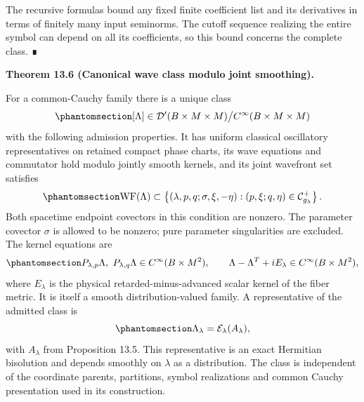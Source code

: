 \documentclass[
  english,
  11pt,
  reqno]{amsart}
\makeatletter
\newcommand{\pandocstatementheading}[1]{%
  \par\addpenalty{\@beginparpenalty}%
  \addvspace{.5\baselineskip plus .2\baselineskip minus .2\baselineskip}%
  {\normalfont\bfseries #1\par}%
  \nobreak\@afterindenttrue\@afterheading
}
\makeatother
\begin{document}
The recursive formulas bound any fixed finite coefficient list and its
derivatives in terms of finitely many input seminorms. The cutoff
sequence realizing the entire symbol can depend on all its coefficients,
so this bound concerns the complete class. ∎

\pandocstatementheading{\protect{}\label{thm:family-global-canonical-wave}Theorem 13.6 (Canonical wave class modulo joint smoothing).}

For a common-Cauchy family there is a unique class
\begin{equation}\protect\phantomsection\label{eq:family-global-wave-class}{
[\Lambda]\in
\mathcal D'(B\times M\times M)\big/
C^\infty(B\times M\times M)
}\end{equation} with the following admission properties. It has uniform
classical oscillatory representatives on retained compact phase charts,
its wave equations and commutator hold modulo jointly smooth kernels,
and its joint wavefront set satisfies
\begin{equation}\protect\phantomsection\label{eq:family-global-joint-positive-relation}{
\operatorname{WF}(\Lambda)\subset
\left\{(\lambda,p,q;\sigma,\xi,-\eta):
(p,\xi;q,\eta)\in\mathcal C_{g_\lambda}^+\right\}.
}\end{equation} Both spacetime endpoint covectors in this condition are
nonzero. The parameter covector \(\sigma\) is allowed to be nonzero;
pure parameter singularities are excluded. The kernel equations are
\begin{equation}\protect\phantomsection\label{eq:family-global-wave-admission}{
P_{\lambda,p}\Lambda,\ P_{\lambda,q}\Lambda
\in C^\infty(B\times M^2),
\qquad
\Lambda-\Lambda^T+iE_\lambda
\in C^\infty(B\times M^2),
}\end{equation} where \(E_\lambda\) is the physical
retarded-minus-advanced scalar kernel of the fiber metric. It is itself
a smooth distribution-valued family. A representative of the admitted
class is
\begin{equation}\protect\phantomsection\label{eq:family-global-wave-construction}{
\Lambda_\lambda=\mathcal E_\lambda(A_\lambda),
}\end{equation} with \(A_\lambda\) from Proposition 13.5. This
representative is an exact Hermitian bisolution and depends smoothly on
\(\lambda\) as a distribution. The class is independent of the
coordinate parents, partitions, symbol realizations and common Cauchy
presentation used in its construction.
\end{document}

